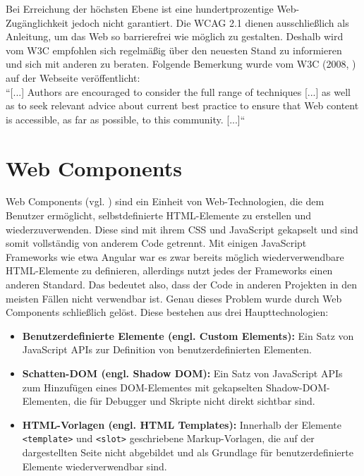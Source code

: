 Bei Erreichung der höchsten Ebene ist eine hundertprozentige Web-Zugänglichkeit jedoch nicht garantiert. Die WCAG 2.1 dienen ausschließlich als Anleitung, um das Web so barrierefrei wie möglich zu gestalten. Deshalb wird vom W3C empfohlen sich regelmäßig über den neuesten Stand zu informieren und sich mit anderen zu beraten. Folgende Bemerkung wurde vom W3C (2008, \cite{wcag_2_1_2018}) auf der Webseite veröffentlicht:\\
``[...] Authors are encouraged to consider the full range of techniques [...] as well as to seek relevant advice about current best practice to ensure that Web content is accessible, as far as possible, to this community. [...]``

\section{Web Components}
\label{web_comp}
Web Components (vgl. \cite{moz_webcomp_2019}) sind ein Einheit von Web-Technologien, die dem Benutzer ermöglicht, selbstdefinierte HTML-Elemente zu erstellen und wiederzuverwenden. Diese sind mit ihrem CSS und JavaScript gekapselt und sind somit vollständig von anderem Code getrennt. Mit einigen JavaScript Frameworks wie etwa Angular war es zwar bereits möglich wiederverwendbare HTML-Elemente zu definieren, allerdings nutzt jedes der Frameworks einen anderen Standard. Das bedeutet also, dass der Code in anderen Projekten in den meisten Fällen nicht verwendbar ist. Genau dieses Problem wurde durch Web Components schließlich gelöst. Diese bestehen aus drei Haupttechnologien:

\begin{itemize}
	\item \textbf{Benutzerdefinierte Elemente (engl. Custom Elements):} Ein Satz von JavaScript APIs zur Definition von benutzerdefinierten Elementen.
	\item \textbf{Schatten-DOM (engl. Shadow DOM):} Ein Satz von JavaScript APIs zum Hinzufügen eines DOM-Elementes mit gekapselten Shadow-DOM-Elementen, die für Debugger und Skripte nicht direkt sichtbar sind.
	\item \textbf{HTML-Vorlagen (engl. HTML Templates):} Innerhalb der Elemente \texttt{<template>} und \texttt{<slot>} geschriebene Markup-Vorlagen, die auf der dargestellten Seite nicht abgebildet und als Grundlage für benutzerdefinierte Elemente wiederverwendbar sind.
\end{itemize}


